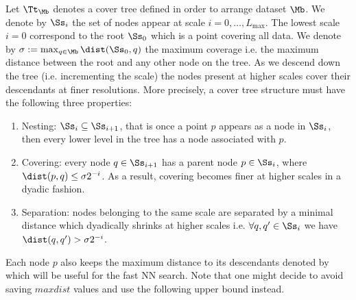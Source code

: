 Let $\Tt_\Mb$ denotes a cover tree defined in order to arrange dataset $\Mb$.  %
We denote by $\Ss_i$ the set of nodes appear at scale $i=0,\dots,L_{\max}$.
The lowest scale $i=0$ correspond to the root $\Ss_0$ which is a point covering all data. We denote by $\sigma:=\max_{q\in\Mb}\dist(\Ss_0,q)$ the maximum coverage i.e. the maximum distance between the root and any other node on the tree. As we descend down the tree (i.e. incrementing the scale) the nodes present at higher scales cover their descendants at finer resolutions. More precisely, a cover tree structure must have the following  three properties:
\begin{enumerate}
	\item Nesting: $\Ss_i \subseteq \Ss_{i+1}$, 
	that is once a point $p$ appears as a node in $\Ss_i$, then every lower level in the tree has a node associated with $p$.
	\item Covering: every node $q\in \Ss_{i+1}$ has a parent node  $p\in \Ss_{i}$, where $\dist(p,q)\leq \sigma2^{-i} $. As a result, covering becomes finer at higher scales in a dyadic fashion. 
	
	\item Separation: nodes belonging to the same scale are separated by a minimal distance which dyadically shrinks at higher scales i.e. $\forall q,q'\in\Ss_i$ we have $\dist(q,q')>\sigma2^{-i}$.   
\end{enumerate}  
Each node $p$ also keeps the maximum distance to its descendants denoted by
which will be useful for the fast NN search.  Note that one might decide to avoid saving $maxdist$ values and use the following upper bound instead.


{}


